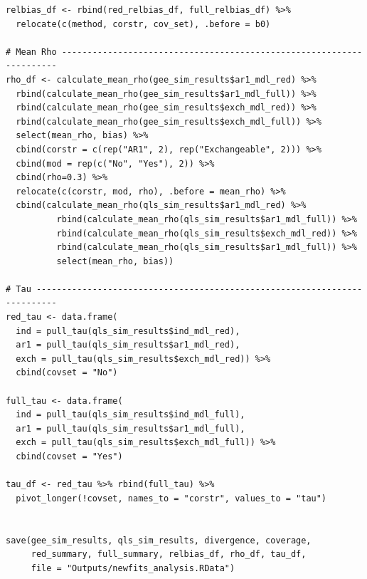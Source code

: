 \documentclass[
]{aft}
\begin{document}
\begin{verbatim}
relbias_df <- rbind(red_relbias_df, full_relbias_df) %>% 
  relocate(c(method, corstr, cov_set), .before = b0)

# Mean Rho ---------------------------------------------------------------------
rho_df <- calculate_mean_rho(gee_sim_results$ar1_mdl_red) %>% 
  rbind(calculate_mean_rho(gee_sim_results$ar1_mdl_full)) %>% 
  rbind(calculate_mean_rho(gee_sim_results$exch_mdl_red)) %>% 
  rbind(calculate_mean_rho(gee_sim_results$exch_mdl_full)) %>% 
  select(mean_rho, bias) %>% 
  cbind(corstr = c(rep("AR1", 2), rep("Exchangeable", 2))) %>% 
  cbind(mod = rep(c("No", "Yes"), 2)) %>% 
  cbind(rho=0.3) %>% 
  relocate(c(corstr, mod, rho), .before = mean_rho) %>% 
  cbind(calculate_mean_rho(qls_sim_results$ar1_mdl_red) %>% 
          rbind(calculate_mean_rho(qls_sim_results$ar1_mdl_full)) %>%
          rbind(calculate_mean_rho(qls_sim_results$exch_mdl_red)) %>% 
          rbind(calculate_mean_rho(qls_sim_results$ar1_mdl_full)) %>% 
          select(mean_rho, bias))

# Tau --------------------------------------------------------------------------
red_tau <- data.frame(
  ind = pull_tau(qls_sim_results$ind_mdl_red),
  ar1 = pull_tau(qls_sim_results$ar1_mdl_red),
  exch = pull_tau(qls_sim_results$exch_mdl_red)) %>% 
  cbind(covset = "No") 

full_tau <- data.frame(
  ind = pull_tau(qls_sim_results$ind_mdl_full),
  ar1 = pull_tau(qls_sim_results$ar1_mdl_full),
  exch = pull_tau(qls_sim_results$exch_mdl_full)) %>% 
  cbind(covset = "Yes")

tau_df <- red_tau %>% rbind(full_tau) %>% 
  pivot_longer(!covset, names_to = "corstr", values_to = "tau") 


save(gee_sim_results, qls_sim_results, divergence, coverage, 
     red_summary, full_summary, relbias_df, rho_df, tau_df,
     file = "Outputs/newfits_analysis.RData")
\end{verbatim}

\newpage


  
\end{document}
